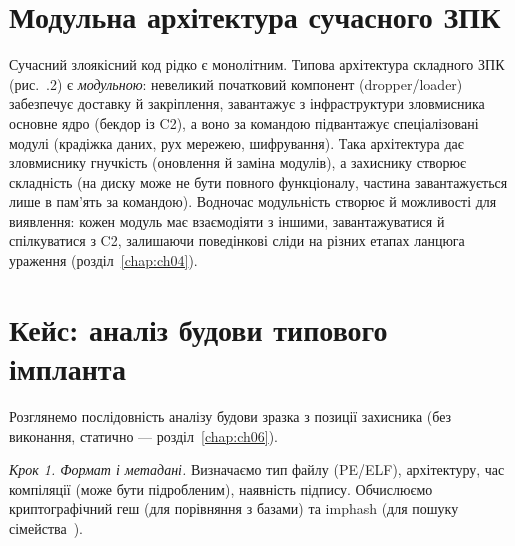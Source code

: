 \section{Модульна архітектура сучасного ЗПК}\label{sec:ch05-modular}

Сучасний злоякісний код рідко є монолітним. Типова архітектура складного ЗПК (рис.~\thechapter.2) є \emph{модульною}: невеликий початковий компонент (dropper/loader) забезпечує доставку й закріплення, завантажує з інфраструктури зловмисника основне ядро (бекдор із C2), а воно за командою підвантажує спеціалізовані модулі (крадіжка даних, рух мережею, шифрування). Така архітектура дає зловмиснику гнучкість (оновлення й заміна модулів), а захиснику створює складність (на диску може не бути повного функціоналу, частина завантажується лише в пам'ять за командою). Водночас модульність створює й можливості для виявлення: кожен модуль має взаємодіяти з іншими, завантажуватися й спілкуватися з C2, залишаючи поведінкові сліди на різних етапах ланцюга ураження (розділ~\ref{chap:ch04}).

\begin{tikzfig}
\end{tikzfig}

\section{Кейс: аналіз будови типового імпланта}\label{sec:ch05-case}

Розглянемо послідовність аналізу будови зразка з позиції захисника (без виконання, статично --- розділ~\ref{chap:ch06}).

\emph{Крок 1. Формат і метадані.} Визначаємо тип файлу (PE/ELF), архітектуру, час компіляції (може бути підробленим), наявність підпису. Обчислюємо криптографічний геш (для порівняння з базами) та imphash (для пошуку сімейства~\cite{ch05:imphash}).

